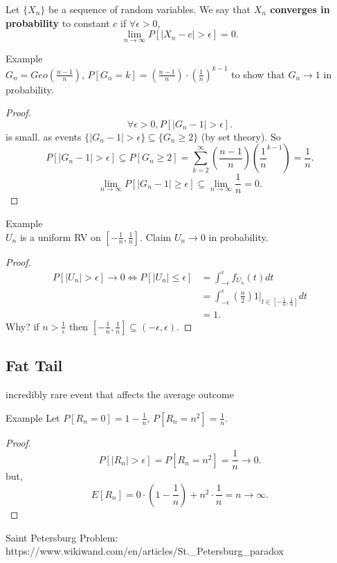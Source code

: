 \documentclass[a4paper]{article}
\begin{document}
\begin{definition}
  Let $\{X_n\} $ be a sequence of random variables. We say that \textbf{$X_n$ converges in probability} to constant  $c$ if  $\forall \epsilon > 0$,
   \[
     \lim_{n \to \infty} P[\mid X_n - c \mid > \epsilon] = 0
  .\] 
\end{definition}

\begin{note}{Example}\\
  $G_n = Geo(\frac{n-1}{n})$, $P[G_n = k] = (\frac{n-1}{n}) \cdot (\frac{1}{n})^{k-1}$ to show that $G_n \to 1$ in probability.

\begin{proof}
\[
  \forall \epsilon > 0, P[|G_n - 1| > \epsilon] 
.\]  is small. as events $\{\mid G_n - 1 \mid > \epsilon\} \subseteq \{G_n \geq 2\}$ (by set theory). So 
\[
  P[\mid G_n - 1 \mid > \epsilon] \subseteq P[G_n \geq 2] = \sum_{k=2}^{\infty} \left( \frac{n-1}{n} \right) \left( \frac{1}{n}^{k-1} \right) = \frac{1}{n}
.\] 
\[
  \lim_{n \to \infty} P[\mid G_n -1 \mid \geq \epsilon] \subseteq \lim_{n \to \infty} \frac{1}{n} = 0
.\] 
\end{proof}
\end{note}

\begin{note}{Example}\\
  $U_n$ is a uniform RV on  $[-\frac{1}{n}, \frac{1}{n}]$. Claim $U_n \to 0$ in probability. 
  \begin{proof}
    \begin{align*}
      P[|U_n| > \epsilon] \to 0 \iff P[\mid U_n\mid  \leq \epsilon] &= \int_{-\epsilon}^{\epsilon} f_{U_n}(t) dt \\
                                                                     &= \int_{-\epsilon}^{\epsilon} (\frac{n}{2}) 1|_{t \in [-\frac{1}{n}, \frac{1}{n}]} dt \\
                                                                     &= 1
    .\end{align*}
    Why? if $n > \frac{1}{\epsilon}$ then $[-\frac{1}{n}, \frac{1}{n}] \subseteq (-\epsilon, \epsilon)$.
  \end{proof}
\end{note}

\subsection{Fat Tail}
incredibly rare event that affects the average outcome
\begin{note}{Example}
  Let $P[R_n = 0] = 1 - \frac{1}{n}$, $P[R_n =n^2] = \frac{1}{n}$.
  \begin{proof}
    \[
      P[|R_n| > \epsilon] = P[R_n =n^2] = \frac{1}{n} \to 0
    .\] 
    but,
    \[
      E[R_n] = 0 \cdot (1-\frac{1}{n}) + n^2 \cdot \frac{1}{n} = n \to \infty
    .\] 
  \end{proof}
\end{note}

Saint Petersburg Problem: https://www.wikiwand.com/en/articles/St._Petersburg_paradox
\end{document}
